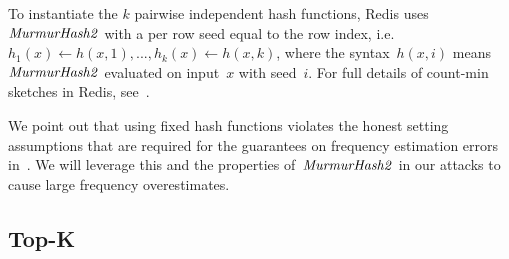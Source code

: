 To instantiate the $k$ pairwise independent hash functions, Redis uses $\mathit{MurmurHash2}$ with a per row seed equal to the row index, i.e. $h_1(x) \gets h(x, 1), ..., h_k(x) \gets h(x, k)$, where the syntax~$h(x,i)$ means $\mathit{MurmurHash2}$ evaluated on input~$x$ with seed~$i$. For full details of count-min sketches in Redis, see~.

 We point out that using fixed hash functions violates the honest setting assumptions that are required for the guarantees on frequency estimation errors in~\cite{cormode2005improved}. We will leverage this and the properties of~$\mathit{MurmurHash2}$ in our attacks to cause large frequency overestimates. 

\subsection{Top-K}

